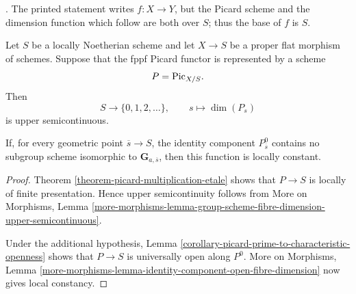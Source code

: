 \begin{lemma}
\label{corollary-picard-dimension-semicontinuity}
\begin{reference}
\cite[Expos\'e 236, Corollary 2.7, p. 234]{FGA}. The printed statement
writes $f:X\to Y$, but the Picard scheme and the dimension function which
follow are both over $S$; thus the base of $f$ is $S$.
\end{reference}
Let $S$ be a locally Noetherian scheme and let $X\to S$ be a proper flat
morphism of schemes. Suppose that the fppf Picard functor is represented by a
scheme
$$
P=\mathrm{Pic}_{X/S}.
$$
Then
$$
S\longrightarrow\{0,1,2,\ldots\},\qquad
s\longmapsto\dim(P_s)
$$
is upper semicontinuous.

If, for every geometric point $\overline{s}\to S$, the identity component
$P^0_{\overline{s}}$ contains no subgroup scheme isomorphic to
$\mathbf G_{a,\overline{s}}$, then this function is locally constant.
\end{lemma}

\begin{proof}
Theorem \ref{theorem-picard-multiplication-etale} shows that $P\to S$ is
locally of finite presentation. Hence upper semicontinuity follows from More
on Morphisms, Lemma
\ref{more-morphisms-lemma-group-scheme-fibre-dimension-upper-semicontinuous}.

Under the additional hypothesis, Lemma
\ref{corollary-picard-prime-to-characteristic-openness} shows that $P\to S$
is universally open along $P^0$. More on Morphisms, Lemma
\ref{more-morphisms-lemma-identity-component-open-fibre-dimension} now gives
local constancy.
\end{proof}

